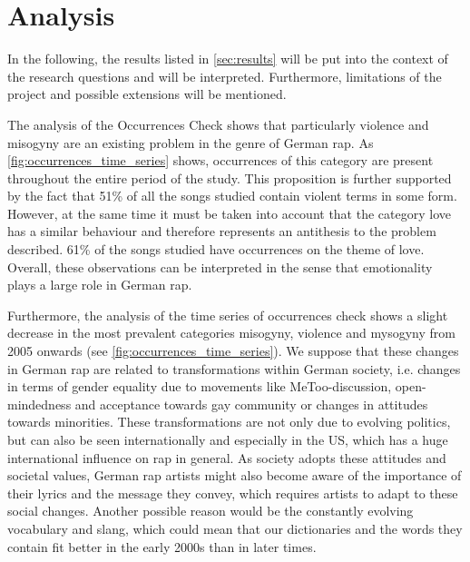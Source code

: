 \section{Analysis}\label{sec:analysis}

In the following, the results listed in \autoref{sec:results} will be put into the context of the research questions and will be interpreted. Furthermore, limitations of the project and possible extensions will be mentioned. 

The analysis of the Occurrences Check shows that particularly violence and misogyny are an existing problem in the genre of German rap. As \autoref{fig:occurrences_time_series} shows, occurrences of this category are present throughout the entire period of the study. This proposition is further supported by the fact that 51\% of all the songs studied contain violent terms in some form. However, at the same time it must be taken into account that the category love has a similar behaviour and therefore represents an antithesis to the problem described. 61\% of the songs studied have occurrences on the theme of love. Overall, these observations can be interpreted in the sense that emotionality plays a large role in German rap.

Furthermore, the analysis of the time series of occurrences check shows a slight decrease in the most prevalent categories misogyny, violence and mysogyny from 2005 onwards (see \autoref{fig:occurrences_time_series}). We suppose that these changes in German rap are related to transformations within German society, i.e. changes in terms of gender equality due to movements like MeToo-discussion, open-mindedness and acceptance towards gay community or changes in attitudes towards minorities. These transformations are not only due to evolving politics, but can also be seen internationally and especially in the US, which has a huge international influence on rap in general. As society adopts these attitudes and societal values, German rap artists might also become aware of the importance of their lyrics and the message they convey, which requires artists to adapt to these social changes. Another possible reason would be the constantly evolving vocabulary and slang, which could mean that our dictionaries and the words they contain fit better in the early 2000s than in later times.

